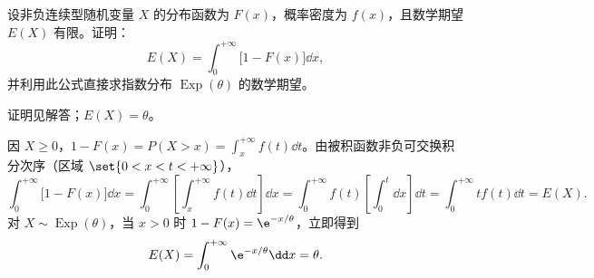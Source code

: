 \begin{exercise}
设非负连续型随机变量 $X$ 的分布函数为 $F(x)$，概率密度为 $f(x)$，且数学期望 $E(X)$ 有限。证明：
\[
  E(X)=\int_{0}^{+\infty}\bigl[1-F(x)\bigr]\dd x,
\]
并利用此公式直接求指数分布 $\operatorname{Exp}(\theta)$ 的数学期望。
\begin{answer}
证明见解答；$E(X)=\theta$。
\end{answer}
\begin{solution}
因 $X\ge 0$，$1-F(x)=P(X>x)=\int_{x}^{+\infty}f(t)\dd t$。由被积函数非负可交换积分次序（区域 $\set{0<x<t<+\infty}$），
\[
  \int_{0}^{+\infty}\bigl[1-F(x)\bigr]\dd x
  =\int_{0}^{+\infty}\left[\int_{x}^{+\infty}f(t)\dd t\right]\dd x
  =\int_{0}^{+\infty}f(t)\left[\int_{0}^{t}\dd x\right]\dd t
  =\int_{0}^{+\infty}t f(t)\dd t=E(X).
\]
对 $X\sim\operatorname{Exp}(\theta)$，当 $x>0$ 时 $1-F(x)=\e^{-x/\theta}$，立即得到
\[
  E(X)=\int_{0}^{+\infty}\e^{-x/\theta}\dd x=\theta.
\]
\end{solution}
\end{exercise}
